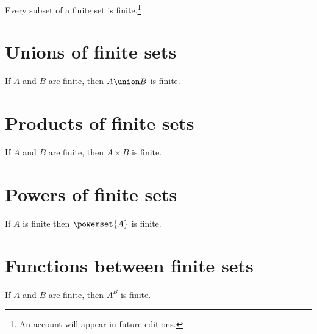 \begin{proposition}
Every subset of a finite set is finite.\footnote{An account will appear in future editions.}\end{proposition}
\section*{Unions of finite sets}

\begin{proposition}
If $A$ and $B$ are finite, then $A \union B$ is finite.\end{proposition}
\section*{Products of finite sets}

\begin{proposition}
If $A$ and $B$ are finite, then $A \times B$ is finite.\end{proposition}
\section*{Powers of finite sets}

\begin{proposition}
If $A$ is finite then $\powerset{A}$ is finite.\end{proposition}
\section*{Functions between finite sets}

\begin{proposition}
If $A$ and $B$ are finite, then $A^B$ is finite.\end{proposition}